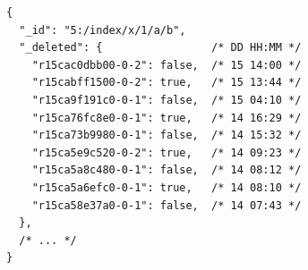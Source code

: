 \documentclass[abstracton,12pt]{scrreprt}
\begin{document}
\begin{figure}
    \begin{multicols}{2}
        \begin{scriptsize}
            \begin{center}
                \begin{verbatim}
{   
  "_id": "5:/index/x/1/a/b", 
  "_deleted": {                 /* DD HH:MM */
    "r15cac0dbb00-0-2": false,  /* 15 14:00 */
    "r15cabff1500-0-2": true,   /* 15 13:44 */
    "r15ca9f191c0-0-1": false,  /* 15 04:10 */
    "r15ca76fc8e0-0-1": true,   /* 14 16:29 */
    "r15ca73b9980-0-1": false,  /* 14 15:32 */
    "r15ca5e9c520-0-2": true,   /* 14 09:23 */
    "r15ca5a8c480-0-1": false,  /* 14 08:12 */
    "r15ca5a6efc0-0-1": true,   /* 14 08:10 */
    "r15ca58e37a0-0-1": false,  /* 14 07:43 */
  },
  /* ... */
}\end{verbatim}
            \end{center}
        \end{scriptsize}
        \columnbreak
        

\end{multicols}
\end{figure}
\end{document}
